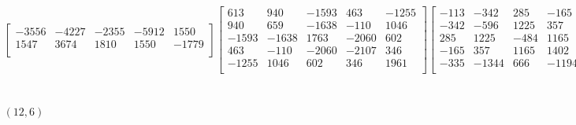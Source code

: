 \documentclass[12pt]{amsart}
\theoremstyle{plain}
\theoremstyle{definition}
\begin{document}
\begin{landscape}
\begin{align*}
\begin{bmatrix}
 -3556  &   -4227  &   -2355  &   -5912  &   1550  \\ 
 1547  &   3674  &   1810  &   1550  &   -1779  \\ 
\end{bmatrix}
\begin{bmatrix}
613  &   940  &   -1593  &   463  &   -1255  \\ 
 940  &   659  &   -1638  &   -110  &   1046  \\ 
 -1593  &   -1638  &   1763  &   -2060  &   602  \\ 
 463  &   -110  &   -2060  &   -2107  &   346  \\ 
 -1255  &   1046  &   602  &   346  &   1961  \\ 
\end{bmatrix}
\begin{bmatrix}
-113  &   -342  &   285  &   -165  &   -335  \\ 
 -342  &   -596  &   1225  &   357  &   -1344  \\ 
 285  &   1225  &   -484  &   1165  &   666  \\ 
 -165  &   357  &   1165  &   1402  &   -1194  \\ 
 -335  &   -1344  &   666  &   -1194  &   -881  \\ 
\end{bmatrix}
\\
(12,6) &:
\begin{bmatrix}
2471  &   -718  &   -3844  &   -1197  &   503  \\ 
 -718  &   1150  &   -16  &   151  &   -146  \\ 
 -3844  &   -16  &   10001  &   1736  &   1448  \\ 
 -1197  &   151  &   1736  &   693  &   -264  \\ 
 503  &   -146  &   1448  &   -264  &   924  \\ 
\end{bmatrix}
\begin{bmatrix}
-6181  &   1013  &   -2606  &   -3291  &   3085  \\ 
 1013  &   15  &   765  &   1145  &   -350  \\ 
 -2606  &   765  &   4787  &   465  &   2367  \\ 
 -3291  &   1145  &   465  &   -2321  &   2574  \\ 
 3085  &   -350  &   2367  &   2574  &   -2806  \\ 
\end{bmatrix}
\begin{bmatrix}

\end{bmatrix}
\end{align*}
\end{landscape}
\end{document}
